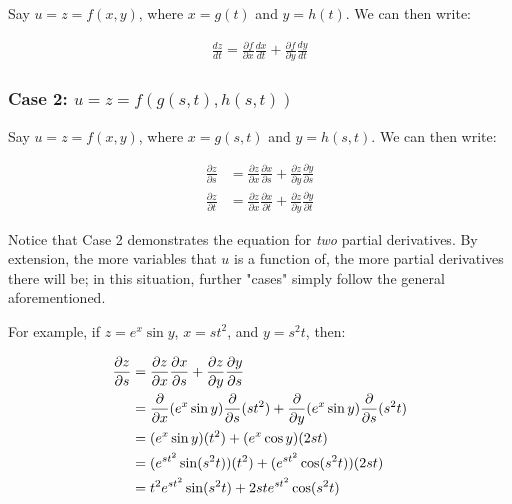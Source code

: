 \documentclass[12pt]{article}
\begin{document}
Say $u = z = f(x,y)$, where $x = g(t)$ and $y = h(t)$. We can then write:

\begin{equation}
    \begin{split}
        \frac{dz}{dt} = \frac{\partial f}{\partial x} \frac{dx}{dt} + \frac{\partial f}{\partial y}\frac{dy}{dt}
    \end{split}
\end{equation}

\subsubsection*{\texorpdfstring{Case 2: $u=z=f(g(s,t),h(s,t))$}{TEXT}}

Say $u = z = f(x,y)$, where $x = g(s,t)$ and $y = h(s,t)$. We can then write:

\begin{equation}
    \begin{split}
        \frac{\partial z}{\partial s}&=\frac{\partial z}{\partial x} \frac{\partial x}{\partial s}+\frac{\partial z}{\partial y} \frac{\partial y}{\partial s}\\
        \frac{\partial z}{\partial t}&=\frac{\partial z}{\partial x} \frac{\partial x}{\partial t}+\frac{\partial z}{\partial y} \frac{\partial y}{\partial t}
    \end{split}
\end{equation}

Notice that Case 2 demonstrates the equation for \textit{two} partial derivatives. By extension, the more variables that $u$ is a function of, the more partial derivatives there will be; in this situation, further "cases" simply follow the general aforementioned. 

For example, if $z = e^x \sin y$, $x = st^2$, and $y = s^2t$, then:

\begin{equation}
    \begin{split}
        \frac{\partial z}{\partial s} &= \frac{\partial z}{\partial x} \frac{\partial x}{\partial s} + \frac{\partial z}{\partial y} \frac{\partial y}{\partial s}\\
        &= \frac{\partial }{\partial x}(e^x \sin y) \frac{\partial }{\partial s}(st^2) + \frac{\partial }{\partial y}(e^x \sin y) \frac{\partial }{\partial s}(s^2t)\\
        &= (e^x \sin y)(t^2) + (e^x \cos y)(2st)\\
        &= (e^{st^2} \sin(s^2t))(t^2) + (e^{st^2} \cos(s^2t))(2st)\\
        &= t^2 e^{s t^2} \sin(s^2 t)+2 s t e^{s t^2} \cos(s^2 t)
    \end{split}
\end{equation}
\end{document}
